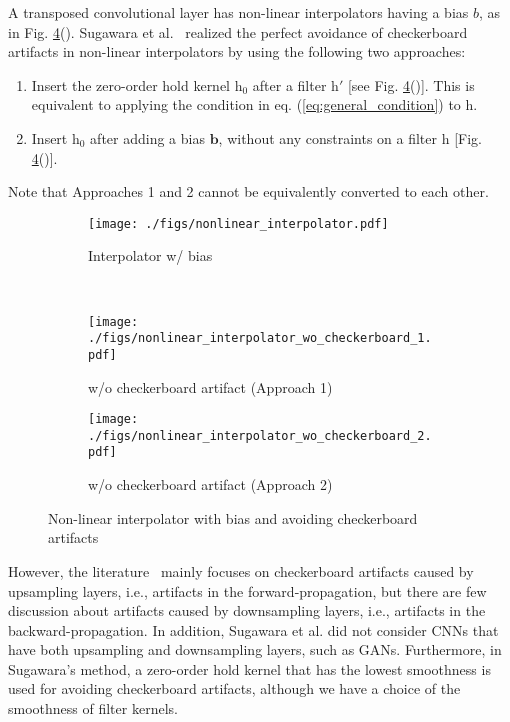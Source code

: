 \documentclass{article}
\newcommand{\myvector}[1]{\boldsymbol{#1}}
\newcommand{\mymatrix}[1]{\mathrm{#1}}
\newcounter{num}
\begin{document}
  A transposed convolutional layer has non-linear interpolators having a bias $b$,
  as in Fig. \ref{fig:nonlinear}().
  Sugawara et al.~\cite{sugawara2018super, sugawara2019checkerboard}
  realized the perfect avoidance of checkerboard artifacts
  in non-linear interpolators by using the following two approaches:
  \begin{enumerate}[nosep, label=\textbf{Approach \arabic*}, leftmargin=*]
    \item Insert the zero-order hold kernel $\mymatrix{h}_0$ after
      a filter $\mymatrix{h}'$
      [see Fig. \ref{fig:nonlinear}()].
      This is equivalent to applying the condition in eq. (\ref{eq:general_condition})
      to $\mymatrix{h}$.
    \item Insert $\mymatrix{h}_0$ after adding a bias $\myvector{b}$,
      without any constraints on a filter $\mymatrix{h}$
      [Fig. \ref{fig:nonlinear}()].
  \end{enumerate}
  Note that Approaches 1 and 2 cannot be equivalently converted to each other.
\begin{figure}[!t]
  \centering
  \begin{subfigure}[t]{0.40\hsize}
    \centering
    \texttt{[image: ./figs/nonlinear\_interpolator.pdf]}
    \caption{Interpolator w/ bias\label{fig:nonlin_interpolator}}
  \end{subfigure}\\
  \begin{subfigure}[t]{0.40\hsize}
    \centering
    \texttt{[image: ./figs/nonlinear\_interpolator\_wo\_checkerboard\_1.pdf]}
    \caption{w/o checkerboard artifact (Approach 1) \label{fig:nonlin_wo_checkerboard_1}}
  \end{subfigure}
  \begin{subfigure}[t]{0.40\hsize}
    \centering
    \texttt{[image: ./figs/nonlinear\_interpolator\_wo\_checkerboard\_2.pdf]}
    \caption{w/o checkerboard artifact (Approach 2) \label{fig:nonlin_wo_checkerboard_2}}
  \end{subfigure}
  \vspace{-2ex}
  \caption{Non-linear interpolator with bias
    and avoiding checkerboard artifacts \label{fig:nonlinear}}
\end{figure}

  However, the literature~\cite{sugawara2019checkerboard}
  mainly focuses on checkerboard artifacts caused by upsampling layers,
  i.e., artifacts in the forward-propagation,
  but there are few discussion about artifacts caused by downsampling layers,
  i.e., artifacts in the backward-propagation.
  In addition, Sugawara et al. did not consider CNNs
  that have both upsampling and downsampling layers, such as GANs.
  Furthermore, in Sugawara's method,
  a zero-order hold kernel that has the lowest smoothness
  is used for avoiding checkerboard artifacts,
  although we have a choice of the smoothness of filter kernels.
\end{document}

